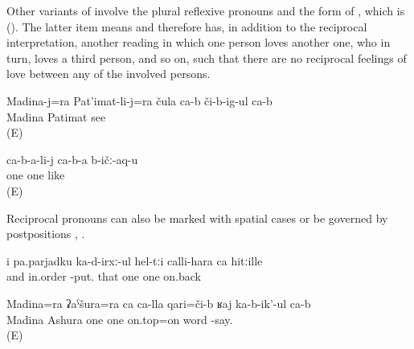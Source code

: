 Other variants of  involve the plural reflexive pronouns  and the  form of  , which is   (). The latter item means  and therefore  has, in addition to the reciprocal interpretation, another reading in which one person loves another one, who in turn, loves a third person, and so on, such that there are no reciprocal feelings of love between any of the involved persons.

\begin{exe}
		\ex	\label{ex:Madina and Patimat see each other@14a}
		\gll	Madina-j=ra	Pat'imat-li-j=ra	čula	ca-b 	či-b-ig-ul	ca-b\\
			Madina	Patimat			see	\\
		\glt	{} (E)

		\ex	\label{ex:(They) love each other@14b}
		\gll	ca-b-a-li-j	ca-b-a	b-ičː-aq-u\\
			one	one	like\\
		\glt	{} (E)

\end{exe}

Reciprocal pronouns can also be marked with spatial cases  or be governed by postpositions , .

\begin{exe}
	\ex	\label{ex:and putting them in order one after the other}
	\gll	i	pa.parjadku	ka-d-irxː-ul	hel-tːi	calli-hara	ca	hitːille\\
		and	in.order	-put.	that	one	one	on.back\\
	\glt	{}

	\ex	\label{ex:Madina and Ashura talk about each other}
	\gll	Madina=ra	ʡaˁšura=ra	ca	ca-lla	qari=či-b	ʁaj	ka-b-ik'-ul	ca-b\\
		Madina	Ashura	one	one	on.top=on	word	-say.	\\
	\glt	{} (E)
\end{exe}

